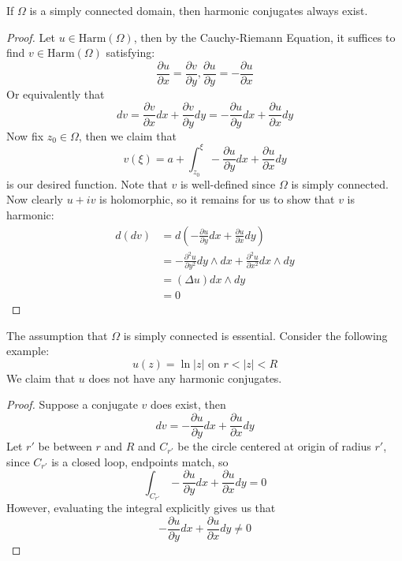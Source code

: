 \documentclass{article}
\begin{document}
\begin{theorem}
    If $\Omega$ is a simply connected domain, then harmonic conjugates always exist.
\end{theorem}

\begin{proof}
    Let $u \in \text{Harm}(\Omega)$, then by the Cauchy-Riemann Equation, it suffices to find $v \in \text{Harm}(\Omega)$ satisfying:
    \[\frac{\partial u}{\partial x} = \frac{\partial v}{\partial y}, \frac{\partial u}{\partial y} = -\frac{\partial u}{\partial x}\]
    Or equivalently that
    \[dv = \frac{\partial v}{\partial x} dx + \frac{\partial v}{\partial y} dy = - \frac{\partial u}{\partial y} dx + \frac{\partial u}{\partial x} dy\]
    Now fix $z_0 \in \Omega$, then we claim that
    \[v(\xi) = a + \int_{z_0}^\xi - \frac{\partial u}{\partial y} dx + \frac{\partial u}{\partial x} dy\]
    is our desired function. Note that $v$ is well-defined since $\Omega$ is simply connected. Now clearly $u + iv$ is holomorphic, so it remains for us to show that $v$ is harmonic:
    \begin{align*}
        d(dv) &= d(- \frac{\partial u}{\partial y} dx + \frac{\partial u}{\partial x} dy)\\
        &= -\frac{\partial^2 u}{\partial y^2} dy \wedge dx + \frac{\partial^2 u}{\partial x^2} dx \wedge dy\\
        &= (\Delta u) dx \wedge dy\\
        &= 0 \tag*{$u$ is harmonic}
    \end{align*}
\end{proof}

\begin{remark}
    The assumption that $\Omega$ is simply connected is essential. Consider the following example:
    \[u(z) = \ln |z| \text{ on } r < |z| < R\]
    We claim that $u$ does not have any harmonic conjugates.
\end{remark}

\begin{proof}
Suppose a conjugate $v$ does exist, then
\[dv = - \frac{\partial u}{\partial y} dx + \frac{\partial u}{\partial x} dy\]
Let $r'$ be between $r$ and $R$ and $C_{r'}$ be the circle centered at origin of radius $r'$, since $C_{r'}$ is a closed loop, endpoints match, so
\[\int_{C_{r'}} - \frac{\partial u}{\partial y} dx + \frac{\partial u}{\partial x} dy = 0\]
However, evaluating the integral explicitly gives us that 
\[- \frac{\partial u}{\partial y} dx + \frac{\partial u}{\partial x} dy \neq 0\]
\end{proof}
\end{document}
